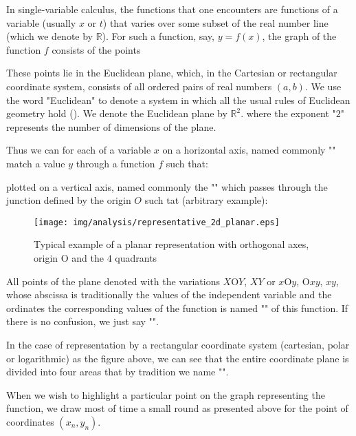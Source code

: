 In single-variable calculus, the functions that one encounters are functions of a variable (usually $x$ or $t$) that varies over some subset of the real number line (which we denote by $\mathbb{R}$). For such a function, say, $y = f (x)$, the graph of the function $f$ consists of the points 
	
These points lie in the Euclidean plane, which, in the Cartesian or rectangular
coordinate system, consists of all ordered pairs of real numbers $(a,b)$. We use the word "Euclidean" to denote a system in which all the usual rules of Euclidean geometry hold (). We denote the Euclidean plane by $\mathbb{R}^2$. where the exponent "$2$" represents the number of dimensions of the plane.

Thus we can for each of a variable $x$ on a horizontal axis, named commonly "" match a value $y$ through a function $f$ such that:
	
plotted on a vertical axis, named commonly the "" which passes through the junction defined by the origin $O$ such tat (arbitrary example):
\begin{figure}[H]
\centering
\texttt{[image: img/analysis/representative\_2d\_planar.eps]}
\caption{Typical example of a planar representation with orthogonal axes, origin O and the $4$ quadrants}
\end{figure}
All points of the plane denoted with the variations $X\text{O}Y$, $XY$ or $x\text{O}y$, $\text{O}xy$, $xy$, whose abscissa is traditionally the values of the independent variable and the ordinates the corresponding values of the function is named "" of this function. If there is no confusion, we just say "".

In the case of representation by a rectangular coordinate system (cartesian, polar or logarithmic) as the figure above, we can see that the entire coordinate plane is divided into four areas that by tradition we name "".

	\begin{tcolorbox}[title=Remark,colframe=black,arc=10pt]
	When we wish to highlight a particular point on the graph representing the function, we draw most of time a small round as presented above for the point of coordinates $(x_n,y_n)$.
	\end{tcolorbox}	

